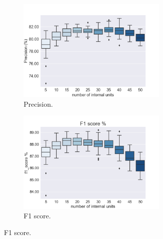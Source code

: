 \begin{multicols}{2}
\begin{figure}[H]
    \centering
    \begin{subfigure}[b]{0.6\textwidth}
        \centering
        \includegraphics[width=0.8\textwidth]{img/precision.png}
        \caption{Precision.}
        \label{fig:precision}
    \end{subfigure}
    \begin{subfigure}[b]{0.6\textwidth}
        \centering
        \includegraphics[width=0.8\textwidth]{img/f1_score.png}
        \caption{F1 score.}
        \label{fig:f1score}
    \end{subfigure}
\end{figure}
\end{multicols}


